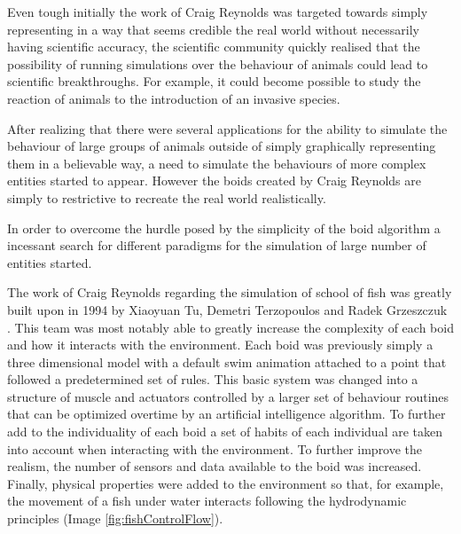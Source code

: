 \documentclass[sigconf]{acmart}
\begin{document}
Even tough initially the work of Craig Reynolds was targeted towards simply representing
in a way that seems credible the real world without necessarily having scientific
accuracy, the scientific community quickly realised that the possibility of running
simulations over the behaviour of animals could lead to scientific breakthroughs.
For example, it could become possible to study the reaction of animals to the
introduction of an invasive species.

After realizing that there were several applications for the ability to simulate the
behaviour of large groups of animals outside of simply graphically representing them in
a believable way, a need to simulate the behaviours of more complex entities started
to appear. However the boids created by Craig Reynolds are simply to restrictive to recreate
the real world realistically.

In order to overcome the hurdle posed by the simplicity of the boid algorithm a
incessant search for different paradigms for the simulation of large number of
entities started.

The work of Craig Reynolds regarding the simulation of school of fish was greatly
built upon in 1994 by Xiaoyuan Tu, Demetri Terzopoulos and Radek Grzeszczuk
\cite{Terzopoulos94artificialfishes:}. This team
was most notably able to greatly increase the complexity of each boid and how it
interacts with the environment. Each boid was previously simply a three dimensional
model with a default swim animation attached to a point that followed a predetermined
set of rules.
This basic system was changed into a structure of muscle and actuators controlled by
a larger set of behaviour routines that can be optimized overtime by an artificial
intelligence algorithm. To further add to the individuality of each boid a set of
habits of each individual are taken into account when interacting with the
environment. To further improve the realism, the number of sensors and data
available to the boid was increased. Finally, physical properties were added to
the environment so that, for example, the movement of a fish under water
interacts following the hydrodynamic principles (Image \ref{fig:fishControlFlow}).
\end{document}
